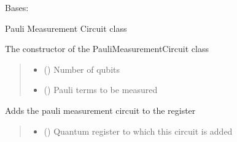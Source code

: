 \documentclass[letterpaper,10pt,english]{sphinxmanual}
\begin{document}

\begin{fulllineitems}
\label{\detokenize{qcompute_qapp.circuit:qcompute_qapp.circuit.PauliMeasurementCircuit}}
\pysigstartsignatures
{}
\pysigstopsignatures
\sphinxAtStartPar
Bases: {\hyperref[\detokenize{qcompute_qapp.circuit:qcompute_qapp.circuit.BasicCircuit}]{}}

\sphinxAtStartPar
Pauli Measurement Circuit class

\sphinxAtStartPar
The constructor of the PauliMeasurementCircuit class
\begin{quote}\begin{description}
\begin{itemize}
\item {} 
\sphinxAtStartPar
{} () \textendash{} Number of qubits

\item {} 
\sphinxAtStartPar
{} () \textendash{} Pauli terms to be measured

\end{itemize}

\end{description}\end{quote}

\begin{fulllineitems}
\label{\detokenize{qcompute_qapp.circuit:qcompute_qapp.circuit.PauliMeasurementCircuit.add_circuit}}
\pysigstartsignatures
{}
\pysigstopsignatures
\sphinxAtStartPar
Adds the pauli measurement circuit to the register
\begin{quote}\begin{description}
\begin{itemize}
\item {} 
\sphinxAtStartPar
{} () \textendash{} Quantum register to which this circuit is added


\end{itemize}
\end{description}
\end{quote}
\end{fulllineitems}
\end{fulllineitems}
\end{document}
